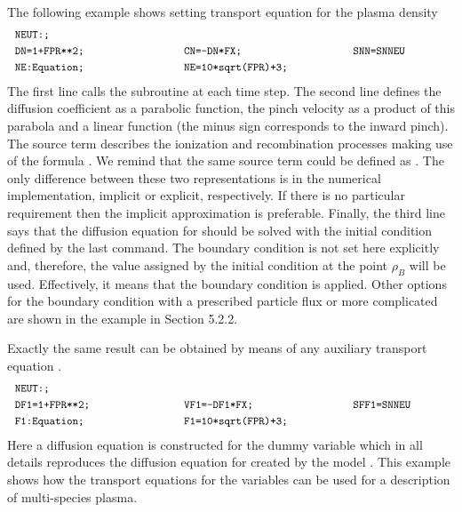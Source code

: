 The following example shows setting transport equation for the plasma
density 
\begin{equation}\label{model1}
\begin{tabular}{p{5cm}p{5cm}p{3cm}}
\multicolumn{3}{l}{\tt NEUT:;}\smallskip\\
{\tt DN=1+FPR**2;} & {\tt CN=-DN*FX;} & {\tt SNN=SNNEU}\smallskip\\
{\tt NE:Equation;} & {\tt NE=10*sqrt(FPR)+3;} & \smallskip\\
\end{tabular}
\end{equation}
The first line calls the subroutine  at each time step. 
The second line defines the diffusion coefficient  as a parabolic
function, the pinch velocity  as a product of this parabola and a
linear function (the minus sign corresponds to the inward pinch). 
The source term  describes the ionization and recombination
processes making use of the formula . 
We remind that the same source term could be defined as .
The only difference between these two representations is in the numerical
implementation, implicit or explicit, respectively. 
If there is no particular requirement then the implicit approximation is
preferable. 
Finally, the third line says that the diffusion equation for 
should be solved with the initial condition defined by the last command.
The boundary condition is not set here explicitly and, therefore, the
value assigned by the initial condition at the point $\rho_B$ will be
used. 
Effectively, it means that the boundary condition  is applied.
Other options for the boundary condition with a prescribed particle flux
or more complicated are shown in the example in Section 5.2.2.

Exactly the same result can be obtained by means of any auxiliary
transport equation .
$$
\begin{tabular}{p{5cm}p{5cm}p{3cm}}
\multicolumn{3}{l}{\tt NEUT:;}\smallskip\\
{\tt DF1=1+FPR**2;} & {\tt VF1=-DF1*FX;} & {\tt SFF1=SNNEU}\smallskip\\
{\tt F1:Equation;} & {\tt F1=10*sqrt(FPR)+3;} & \smallskip\\
\end{tabular}
$$
Here a diffusion equation is constructed for the dummy variable 
which in all details reproduces the diffusion equation for 
created by the model . 
This example shows how the transport equations for the variables  can be used for a description of multi-species plasma.

